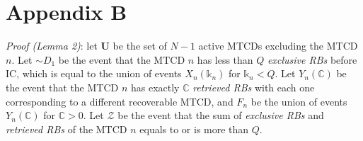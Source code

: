 \documentclass[a4paper]{IEEEtran}
\begin{document}
\section*{Appendix B}
\textit{Proof (Lemma 2)}: let $\pmb{U}$ be the set of $N-1$ active MTCDs excluding the MTCD $n$. Let $\sim D_1$ be the event that the MTCD $n$ has less than $Q$ \emph{exclusive RBs} before IC, which is equal to the union of events $X_n(\mathbb{k}_n)$ for $\mathbb{k}_n < Q$. Let $Y_n(\mathbb{C})$ be the event that the MTCD $n$ has exactly $\mathbb{C}$ \emph{retrieved RBs} with each one corresponding to a different recoverable MTCD, and $F_n$ be the union of events $Y_n(\mathbb{C})$ for $\mathbb{C} > 0$. Let $\mathcal{Z}$ be the event that the sum of \emph{exclusive RBs} and \emph{retrieved RBs} of the MTCD $n$ equals to or is more than $Q$.
\end{document}

